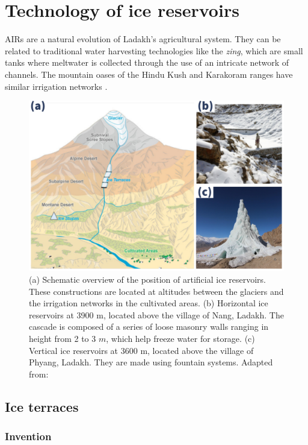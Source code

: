 \chapter{Technology of ice reservoirs}

AIRs are a natural evolution of Ladakh's agricultural system. They can be related to traditional water
harvesting technologies like the {\it zing}, which are small tanks where meltwater is collected through the use
of an intricate network of channels. The mountain oases of the Hindu Kush and Karakoram ranges
have similar irrigation networks \citep{nusserLocalKnowledgeGlobal2016}.

\begin{figure}[t]
\centering
\includegraphics[width=12cm]{Figures/AIR_forms.jpg}

\caption{(a) Schematic overview of the position of artificial ice reservoirs. These constructions are located at
  altitudes between the glaciers and the irrigation networks in the cultivated areas. (b) Horizontal ice
  reservoirs at 3900 m, located above the village of Nang, Ladakh. The cascade is composed of a series of loose
  masonry walls ranging in height from 2 to 3 $m$, which help freeze water for storage. (c) Vertical ice
reservoirs at 3600 m, located above the village of Phyang, Ladakh. They are made using fountain systems. Adapted
from: \cite{nusserLocalKnowledgeGlobal2016}}

\label{fig:AIRforms}
\end{figure}

\section{Ice terraces}

\subsection{Invention}

